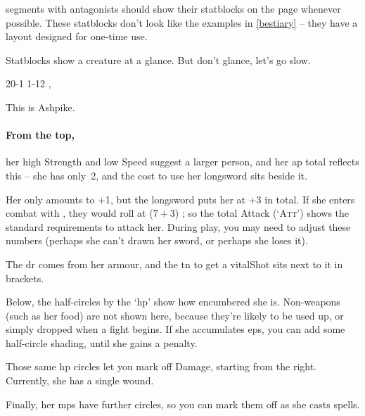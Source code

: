 \begin{multicols}{2}

\noindent
\Glspl{segment} with antagonists should show their statblocks on the page whenever possible.
These statblocks don't look like the examples in \autoref{bestiary} -- they have a layout designed for one-time use.

Statblocks show a creature at a glance.
But don't glance, let's go slow.


%
  {{2}{0}{-1}}%
  {{1}{-1}{2}}%
  {
    \setcounter{Academics}{2}
    \setcounter{Crafts}{2}
    \setcounter{Medicine}{1}
    \setcounter{Combat}{1}
    \setcounter{Fire}{2}
    \setcounter{Air}{2}
    \setcounter{Earth}{1}
    \longsword
    \partialleather
  }%
  {}%
  {%
    \lootMagic, \rations
  }%
  {}%

This is Ashpike.

\paragraph{From the top,}
her high Strength and low Speed suggest a larger person, and her \gls{ap} total reflects this -- she has only~2, and the cost to use her longsword sits beside it.

Her  only amounts to +1, but the longsword puts her at +3 in total.
If she enters combat with , they would roll at ($7+3$) \tn[10]; so the total Attack (`{\scshape Att}') shows the standard requirements to attack her.
During play, you may need to adjust these numbers (perhaps she can't drawn her sword, or perhaps she loses it).

The \gls{dr} comes from her armour, and the \gls{tn} to get a \gls{vitalShot} sits next to it in brackets.

Below, the half-circles by the `\gls{hp}' show how encumbered she is.
Non-weapons (such as her food) are not shown here, because they're likely to be used up, or simply dropped when a fight begins.
If she accumulates \glspl{ep}, you can add some half-circle shading, until she gains a penalty.

Those same \gls{hp} circles let you mark off Damage, starting from the right.
Currently, she has a single wound.

Finally, her \glspl{mp} have further circles, so you can mark them off as she casts spells.


\end{multicols}
